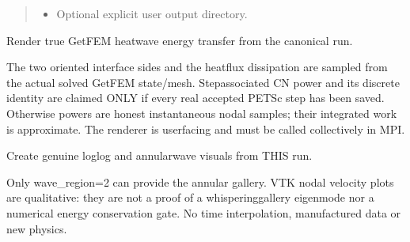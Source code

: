 \documentclass[letterpaper,10pt,english]{sphinxmanual}
\begin{document}
\begin{fulllineitems}
\begin{quote}
\begin{description}
\begin{itemize}
\item {} 
\sphinxAtStartPar
{} \textendash{} Optional explicit user output directory.

\end{itemize}

\end{description}\end{quote}

\end{fulllineitems}



\begin{fulllineitems}

\pysigstartsignatures
\pysiglinewithargsret
{}
{\sphinxparamcomma {}\sphinxparamcomma {}\sphinxparamcomma {}}
{}
\pysigstopsignatures
\sphinxAtStartPar
Render true GetFEM heat\sphinxhyphen{}wave energy transfer from the canonical run.

\sphinxAtStartPar
The two oriented interface sides and the heat\sphinxhyphen{}flux dissipation are
sampled from the actual solved GetFEM state/mesh. Step\sphinxhyphen{}associated
CN power and its discrete identity are claimed ONLY if every real
accepted PETSc step has been saved. Otherwise powers are honest
instantaneous nodal samples; their integrated work is approximate.
The renderer is user\sphinxhyphen{}facing and must be called collectively in MPI.

\end{fulllineitems}



\begin{fulllineitems}

\pysigstartsignatures
\pysiglinewithargsret
{}
{\sphinxparamcomma {}\sphinxparamcomma {}\sphinxparamcomma {}\sphinxparamcomma {}\sphinxparamcomma {}}
{}
\pysigstopsignatures
\sphinxAtStartPar
Create genuine log\sphinxhyphen{}log and annular\sphinxhyphen{}wave visuals from THIS run.

\sphinxAtStartPar
Only wave\_region=2 can provide the annular gallery. VTK nodal
velocity plots are qualitative: they are not a proof of a
whispering\sphinxhyphen{}gallery eigenmode nor a numerical energy conservation
gate. No time interpolation, manufactured data or new physics.

\end{fulllineitems}
\end{document}
